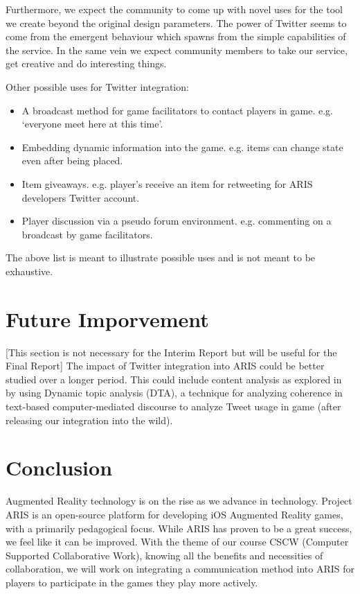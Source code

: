 \documentclass{sigchi}
\begin{document}
Furthermore, we expect the community to come up with novel uses for the tool we create beyond the original design parameters. The power of Twitter seems to come from the emergent behaviour which spawns from the simple capabilities of the service. In the same vein we expect community members to take our service, get creative and do interesting things.

Other possible uses for Twitter integration:

\begin{itemize}
  \item A broadcast method for game facilitators to contact players in game. e.g. ‘everyone meet here at this time’.
  \item Embedding dynamic information into the game. e.g. items can change state even after being placed.
  \item Item giveaways. e.g. player’s receive an item for retweeting for ARIS developers Twitter account.
  \item Player discussion via a pseudo forum environment. e.g. commenting on a broadcast by game facilitators.
\end{itemize}

The above list is meant to illustrate possible uses and is not meant to be exhaustive.

\section{Future Imporvement}
[This section is not necessary for the Interim Report but will be useful for the Final Report]
The impact of Twitter integration into ARIS could be better studied over a longer period. This could include content analysis as explored in \cite{beyond2009} by using Dynamic topic analysis (DTA), a technique for analyzing coherence in text-based computer-mediated discourse to analyze Tweet usage in game (after releasing our integration into the wild).
\section{Conclusion}

Augmented Reality technology is on the rise as we advance in technology. Project ARIS is an open-source platform for developing iOS Augmented Reality games, with a primarily pedagogical focus. While ARIS has proven to be a great success, we feel like it can be improved. With the theme of our course CSCW (Computer Supported Collaborative Work), knowing all the benefits and necessities of collaboration, we will work on integrating a communication method into ARIS for players to participate in the games they play more actively.  
\end{document}
